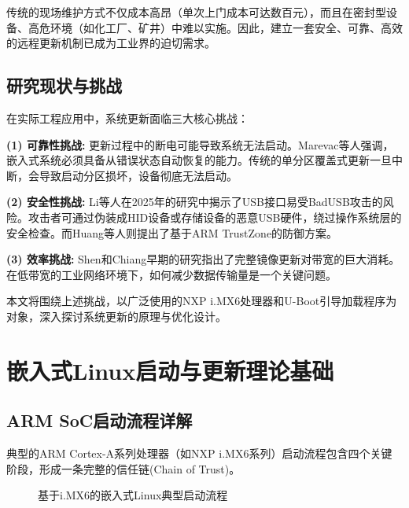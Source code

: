 \documentclass[a4paper,12pt]{article}
\begin{document}
传统的现场维护方式不仅成本高昂（单次上门成本可达数百元），而且在密封型设备、高危环境（如化工厂、矿井）中难以实施。因此，建立一套安全、可靠、高效的远程更新机制已成为工业界的迫切需求。

\subsection{研究现状与挑战}
在实际工程应用中，系统更新面临三大核心挑战：

\textbf{(1) 可靠性挑战:} 更新过程中的断电可能导致系统无法启动。Marevac等人强调，嵌入式系统必须具备从错误状态自动恢复的能力\cite{Marevac2025}。传统的单分区覆盖式更新一旦中断，会导致启动分区损坏，设备彻底无法启动。

\textbf{(2) 安全性挑战:} Li等人在2025年的研究中揭示了USB接口易受BadUSB攻击的风险\cite{Li2025}。攻击者可通过伪装成HID设备或存储设备的恶意USB硬件，绕过操作系统层的安全检查。而Huang等人则提出了基于ARM TrustZone的防御方案\cite{Huang2022}。

\textbf{(3) 效率挑战:} Shen和Chiang早期的研究指出了完整镜像更新对带宽的巨大消耗\cite{Shen2007}。在低带宽的工业网络环境下，如何减少数据传输量是一个关键问题。

本文将围绕上述挑战，以广泛使用的NXP i.MX6处理器和U-Boot引导加载程序为对象，深入探讨系统更新的原理与优化设计。

\newpage
\section{嵌入式Linux启动与更新理论基础}

\subsection{ARM SoC启动流程详解}
典型的ARM Cortex-A系列处理器（如NXP i.MX6系列）启动流程包含四个关键阶段，形成一条完整的信任链(Chain of Trust)。

\begin{figure}[H]
\centering
{}
\caption{基于i.MX6的嵌入式Linux典型启动流程}
\label{fig:boot_flow}
\end{figure}
\end{document}
